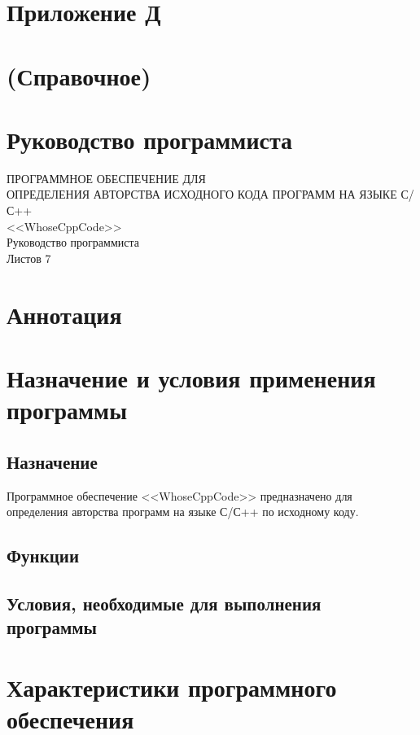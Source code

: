 \newpage
\setcounter{section}{0}
\section*{Приложение Д}
\section*{(Справочное)}
\section*{Руководство программиста}

\hfill

\begin{center}
 ПРОГРАММНОЕ ОБЕСПЕЧЕНИЕ ДЛЯ\\
 ОПРЕДЕЛЕНИЯ АВТОРСТВА ИСХОДНОГО КОДА ПРОГРАММ НА ЯЗЫКЕ С/С++\\
 <<WhoseCppCode>>\\
 
 Руководство программиста\\
 
 Листов 7
\end{center}


\hfill

\newpage
\section*{Аннотация}

\section{Назначение и условия применения программы}
\subsection{Назначение}

Программное обеспечение <<WhoseCppCode>> предназначено для определения авторства программ на 
языке С/С++ по исходному коду.

\subsection{Функции}

\subsection{Условия, необходимые для выполнения программы}

\section{Характеристики программного обеспечения}

